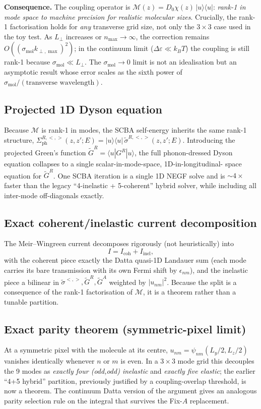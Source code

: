 \documentclass[11pt,a4paper,onecolumn]{article}
\begin{document}
\textbf{Consequence.} The coupling operator is
$\mathcal M(z) = D_0 \chi(z)\,|u\rangle\langle u|$: \emph{rank-1 in mode
space to machine precision for realistic molecular sizes}. Crucially, the
rank-1 factorisation holds for \emph{any} transverse grid size, not only
the $3\times 3$ case used in the toy test. As $L_\perp$ increases or
$n_{\max} \to \infty$, the correction remains
$O((\sigma_{\mathrm{mol}} k_{\perp,\max})^2)$; in the continuum limit
($\Delta\varepsilon \ll k_BT$) the coupling is still rank-1 because
$\sigma_{\mathrm{mol}} \ll L_\perp$. The
$\sigma_{\mathrm{mol}} \to 0$ limit is not an idealisation but an
asymptotic result whose error scales as the sixth power of
$\sigma_{\mathrm{mol}}/(\text{transverse wavelength})$.

\subsection{Projected 1D Dyson equation}
Because $\mathcal M$ is rank-1 in modes, the SCBA self-energy inherits the
same rank-1 structure,
$\Sigma^{R,<,>}_{\mathrm{ph}}(z,z';E) = |u\rangle\langle u|\,
\tilde\sigma^{R,<,>}(z,z';E)$. Introducing the projected Green's function
$\tilde G^R = \langle u | G^R | u\rangle$, the full phonon-dressed Dyson
equation collapses to a single scalar-in-mode-space, 1D-in-longitudinal-
space equation for $\tilde G^R$. One SCBA iteration is a single 1D NEGF
solve and is $\sim\!4\times$ faster than the legacy ``4-inelastic +
5-coherent'' hybrid solver, while including all inter-mode off-diagonals
exactly.

\subsection{Exact coherent/inelastic current decomposition}
The Meir--Wingreen current decomposes rigorously (not heuristically) into
\begin{equation}
I = I_{\mathrm{coh}} + I_{\mathrm{inel}},
\end{equation}
with the coherent piece exactly the Datta quasi-1D Landauer sum (each mode
carries its bare transmission with its own Fermi shift by $\epsilon_{nm}$),
and the inelastic piece a bilinear in $\tilde\sigma^{<,>},\tilde G^R,
\tilde G^A$ weighted by $|u_{nm}|^2$. Because the split is a consequence of
the rank-1 factorisation of $\mathcal M$, it is a theorem rather than a
tunable partition.

\subsection{Exact parity theorem (symmetric-pixel limit)}
At a symmetric pixel with the molecule at its centre,
$u_{nm} = \psi_{nm}(L_y/2, L_z/2)$ vanishes identically whenever $n$ or $m$
is even. In a $3\times 3$ mode grid this decouples the 9 modes as
\emph{exactly four (odd,odd) inelastic} and \emph{exactly five elastic};
the earlier ``4+5 hybrid'' partition, previously justified by a
coupling-overlap threshold, is now a theorem. The continuum Datta
version of the argument gives an analogous parity selection rule on the
integral that survives the Fix-$A$ replacement.
\end{document}
